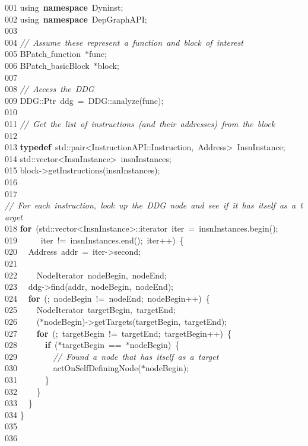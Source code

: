 {\ttfamily \raggedright \small
001 using\ \textbf{namespace}\ Dyninst;\\
002 using\ \textbf{namespace}\ DepGraphAPI;\\
003 \ \\
004 \textsl{//\ Assume\ these\ represent\ a\ function\ and\ block\ of\ interest}\\
005 BPatch\underline\ function\ $\ast$func;\\
006 BPatch\underline\ basicBlock\ $\ast$block;\\
007 \ \\
008 \textsl{//\ Access\ the\ DDG}\\
009 DDG::Ptr\ ddg\ =\ DDG::analyze(func);\\
010 \ \\
011 \textsl{//\ Get\ the\ list\ of\ instructions\ (and\ their\ addresses)\ from\ the\ block}\\
012 \ \\
013 \textbf{typedef}\ std::pair<{}InstructionAPI::Instruction,\ Address>{}\ InsnInstance;\\
014 std::vector<{}InsnInstance>{}\ insnInstances;\\
015 block-{}>{}getInstructions(insnInstances);\\
016 \ \\
017 \textsl{//\ For\ each\ instruction,\ look\ up\ the\ DDG\ node\ and\ see\ if\ it\ has\ itself\ as\ a\ target}\\
018 \textbf{for}\ (std::vector<{}InsnInstance>{}::iterator\ iter\ =\ insnInstances.begin();\\
019 \ \ \ \ \ iter\ !=\ insnInstances.end();\ iter++)\ \{\\
020 \ \ Address\ addr\ =\ iter-{}>{}second;\\
021 \ \ \\
022 \ \ \ \ NodeIterator\ nodeBegin,\ nodeEnd;\\
023 \ \ ddg-{}>{}find(addr,\ nodeBegin,\ nodeEnd);\\
024 \ \ \textbf{for}\ (;\ nodeBegin\ !=\ nodeEnd;\ nodeBegin++)\ \{\\
025 \ \ \ \ NodeIterator\ targetBegin,\ targetEnd;\\
026 \ \ \ \ ($\ast$nodeBegin)-{}>{}getTargets(targetBegin,\ targetEnd);\\
027 \ \ \ \ \textbf{for}\ (;\ targetBegin\ !=\ targetEnd;\ targetBegin++)\ \{\\
028 \ \ \ \ \ \ \textbf{if}\ ($\ast$targetBegin\ ==\ $\ast$nodeBegin)\ \{\\
029 \ \ \ \ \ \ \ \ \textsl{//\ Found\ a\ node\ that\ has\ itself\ as\ a\ target}\\
030 \ \ \ \ \ \ \ \ actOnSelfDefiningNode($\ast$nodeBegin);\\
031 \ \ \ \ \ \ \}\\
032 \ \ \ \ \}\\
033 \ \ \}\\
034 \}\\
035 \ \\
036  }
\normalfont\normalsize

